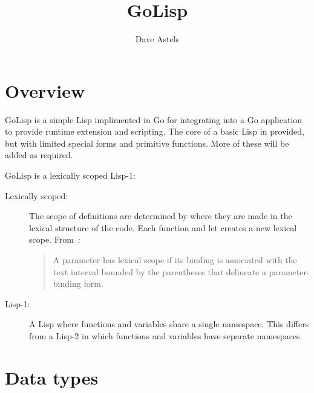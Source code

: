 \documentclass[12pt]{article}
\title{GoLisp}
\author{Dave Astels}
\begin{document}
\maketitle

\section{Overview}

GoLisp is a simple Lisp implimented in Go for integrating into a Go
application to provide runtime extension and scripting. The core of a
basic Lisp in provided, but with limited special forms and primitive
functions. More of these will be added as required. 

GoLisp is a lexically scoped Lisp-1:

\begin{description}
\item[Lexically scoped:] The scope of definitions are determined by
  where they are made in the lexical structure of the code. Each
  function and let creates a new lexical scope. From~\cite{lisp}:

  \begin{quotation}
    A parameter has lexical scope if its binding is associated with
    the text interval bounded by the parentheses that delineate a
    parameter-binding form.
  \end{quotation}

\item[Lisp-1:] A Lisp where functions and variables share a single
  namespace. This differs from a Lisp-2 in which functions and
  variables have separate namespaces.
\end{description}

\section{Data types}
\end{document}
